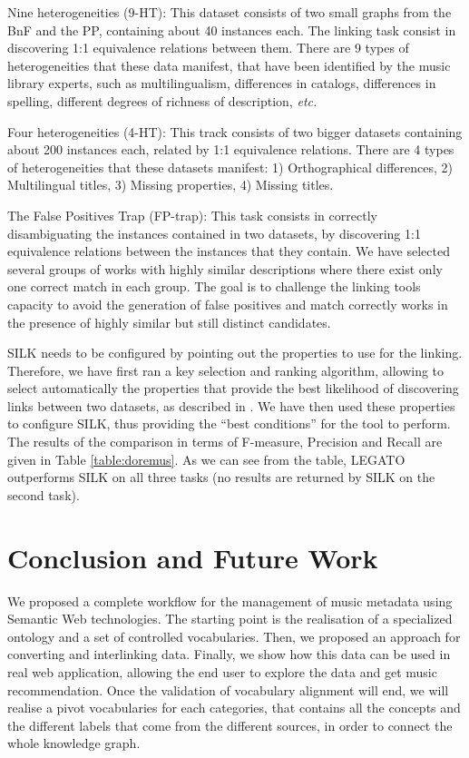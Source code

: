 \documentclass{article}
\begin{document}
Nine heterogeneities (9-HT): This dataset consists of two small graphs from the BnF and the PP, containing about 40 instances each. The linking task consist in discovering 1:1 equivalence relations between them. There are 9 types of heterogeneities that these data manifest, that have been identified by the music library experts, such as multilingualism, differences in catalogs, differences in spelling, different degrees of richness of description, {\it etc.}

Four heterogeneities (4-HT): This track consists of two bigger datasets containing about 200 instances each, related by 1:1 equivalence relations. There are 4 types of heterogeneities that these datasets manifest: 1) Orthographical differences, 2) Multilingual titles, 3) Missing properties, 4) Missing titles.

The False Positives Trap (FP-trap): This task consists in correctly disambiguating the instances contained in two datasets, by discovering 1:1 equivalence relations between the instances that they contain. We have selected several groups of works with highly similar descriptions where there exist only one correct match in each group. The goal is to challenge the linking tools capacity to avoid the generation of false positives and match correctly works in the presence of highly similar but still distinct candidates.

SILK needs to be configured by pointing out the properties to use for the linking. Therefore, we have first ran a key selection and ranking algorithm, allowing to select automatically the properties that provide the best likelihood of discovering links between two datasets, as described in \cite{achichi2016automatic}. We have then used these properties to configure SILK, thus providing the ``best conditions'' for the tool to perform. The results of the comparison in terms of F-measure, Precision and Recall are given in Table \ref{table:doremus}. As we can see from the table, LEGATO outperforms SILK on all three tasks (no results are returned by SILK on the second task). 

\section{Conclusion and Future Work}
\label{sec:conclusion}
We proposed a complete workflow for the management of music metadata using Semantic Web technologies. The starting point is the realisation of a specialized ontology and a set of controlled vocabularies. Then, we proposed an approach for converting and interlinking data. Finally, we show how this data can be used in real web application, allowing the end user to explore the data and get music recommendation. Once the validation of vocabulary alignment will end, we will realise a pivot vocabularies for each categories, that contains all the concepts and the different labels that come from the different sources, in order to connect the whole knowledge graph.
\end{document}
